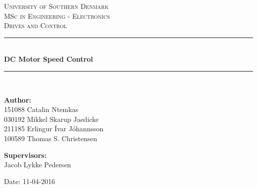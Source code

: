 \begin{titlepage}
\begin{center}

\textsc{\LARGE University of Southern Denmark}\\[1.5cm]
\textsc{\Large MSc in Engineering - Electronics}\\
\textsc{\large Drives and Control}\\[0.5cm]
\vfill
\hrule ~\\[0.3cm]
{ \huge \bfseries DC Motor Speed Control\\[0.4cm] }
\hrule ~\\[1.5cm]
\vfill

\begin{minipage}[t]{.49\textwidth}
\begin{flushleft} \large
\textbf{Author:}\\
151088 Catalin Ntemkas\\
030192 Mikkel Skarup Jaedicke\\
211185 Erlingur Ívar Jóhannsson\\
100589 Thomas S. Christensen
\end{flushleft}
\end{minipage}
\begin{minipage}[t]{.49\textwidth}
\begin{flushright} \large
\textbf{Supervisors:} \\
Jacob Lykke Pedersen\\
\end{flushright}
\end{minipage}

\vspace{1.2cm}
Date: 11-04-2016

\end{center}
\end{titlepage}
